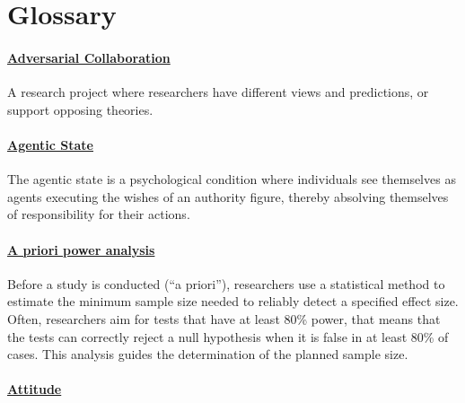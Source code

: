 \documentclass[
  letterpaper,
]{book}
\begin{document}

\chapter*{\texorpdfstring{{Glossary}}{Glossary}}\label{glossary}


\subsubsection*{\texorpdfstring{\hyperref[def-adversarialcollaboration]{Adversarial
Collaboration}}{Adversarial Collaboration}}\label{adversarial-collaboration}

A research project where researchers have different views and
predictions, or support opposing theories.

\subsubsection*{\texorpdfstring{\hyperref[def-agenticstate]{Agentic
State}}{Agentic State}}\label{agentic-state}

The agentic state is a psychological condition where individuals see
themselves as agents executing the wishes of an authority figure,
thereby absolving themselves of responsibility for their actions.

\subsubsection*{\texorpdfstring{\hyperref[def-apriorianalysis]{A priori
power
analysis}}{A priori power analysis}}\label{a-priori-power-analysis}

Before a study is conducted (``a priori''), researchers use a
statistical method to estimate the minimum sample size needed to
reliably detect a specified effect size. Often, researchers aim for
tests that have at least 80\% power, that means that the tests can
correctly reject a null hypothesis when it is false in at least 80\% of
cases. This analysis guides the determination of the planned sample
size.

\subsubsection*{\texorpdfstring{\hyperref[def-attitude]{Attitude}}{Attitude}}\label{attitude}
\end{document}
